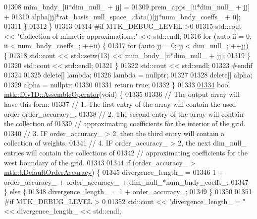 \begin{DoxyCode}
{{01308       mim\_bndy\_[ii*dim\_null\_ + jj] =
01309         prem\_apps\_[ii*dim\_null\_ + jj] +
01310         alpha[jj]*rat\_basis\_null\_space\_.data()[jj*num\_bndy\_coeffs\_ + ii];
01311     \}
01312   \}
01313 
01314 \textcolor{preprocessor}{  #if MTK\_DEBUG\_LEVEL >0}
01315   std::cout << \textcolor{stringliteral}{"Collection of mimetic approximations:"} << std::endl;
01316   \textcolor{keywordflow}{for} (\textcolor{keyword}{auto} ii = 0; ii < num\_bndy\_coeffs\_; ++ii) \{
01317     \textcolor{keywordflow}{for} (\textcolor{keyword}{auto} jj = 0; jj < dim\_null\_; ++jj) \{
01318       std::cout << std::setw(13) << mim\_bndy\_[ii*dim\_null\_ + jj];
01319     \}
01320     std::cout << std::endl;
01321   \}
01322   std::cout << std::endl;
01323 \textcolor{preprocessor}{  #endif}
01324 
01325   \textcolor{keyword}{delete}[] lambda;
01326   lambda = \textcolor{keyword}{nullptr};
01327 
01328   \textcolor{keyword}{delete}[] alpha;
01329   alpha = \textcolor{keyword}{nullptr};
01330 
01331   \textcolor{keywordflow}{return} \textcolor{keyword}{true};
01332 \}
01333 
\hypertarget{mtk__div__1d_8cc_source_l01334}{}\hyperlink{classmtk_1_1Div1D_a5a12482e1ceac232339dd8f647af886b}{01334} \textcolor{keywordtype}{bool} \hyperlink{classmtk_1_1Div1D_a5a12482e1ceac232339dd8f647af886b}{mtk::Div1D::AssembleOperator}(\textcolor{keywordtype}{void}) \{
01335 
01336   \textcolor{comment}{// The output array will have this form:}
01337   \textcolor{comment}{// 1. The first entry of the array will contain the used order order\_accuracy\_.}
01338   \textcolor{comment}{// 2. The second entry of the array will contain the collection of}
01339   \textcolor{comment}{// approximating coefficients for the interior of the grid.}
01340   \textcolor{comment}{// 3. IF order\_accuracy\_ > 2, then the third entry will contain a collection of weights.}
01341   \textcolor{comment}{// 4. IF order\_accuracy\_ > 2, the next dim\_null\_ entries will contain the collections of}
01342   \textcolor{comment}{// approximating coefficients for the west boundary of the grid.}
01343 
01344   \textcolor{keywordflow}{if} (order\_accuracy\_ > \hyperlink{group__c01-roots_ga0d95560098eb36420511103637b6952f}{mtk::kDefaultOrderAccuracy}) \{
01345     divergence\_length\_ =
01346       1 + order\_accuracy\_ + order\_accuracy\_ + dim\_null\_*num\_bndy\_coeffs\_;
01347   \} \textcolor{keywordflow}{else} \{
01348     divergence\_length\_ = 1 + order\_accuracy\_;
01349   \}
01350 
01351 \textcolor{preprocessor}{  #if MTK\_DEBUG\_LEVEL > 0}
01352   std::cout << \textcolor{stringliteral}{"divergence\_length\_ = "} << divergence\_length\_ << std::endl;
}}
\end{DoxyCode}
